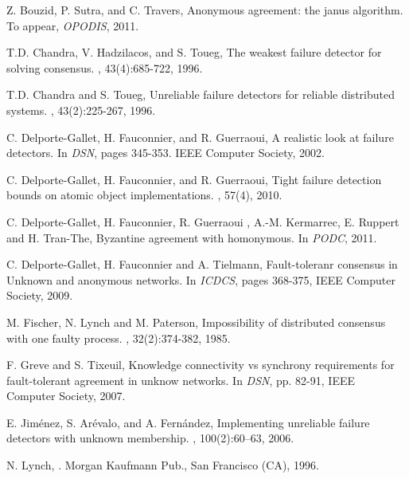 \documentclass[10pt, conference, compsocconf]{IEEEtran}
\begin{document}
\begin{thebibliography}{10}
{
Z. Bouzid, P. Sutra, and C. Travers,
\newblock Anonymous agreement: the janus algorithm.
\newblock To appear,  {\em OPODIS}, 2011.

T.D. Chandra, V. Hadzilacos, and S. Toueg,
\newblock The weakest failure detector for solving consensus.
, 43(4):685-722, 1996.

T.D. Chandra and S. Toueg,
\newblock Unreliable failure detectors for reliable distributed systems.
, 43(2):225-267, 1996.




C. Delporte-Gallet, H. Fauconnier, and R. Guerraoui,
\newblock A realistic look at failure detectors.
\newblock In {\em DSN}, pages 345-353. IEEE Computer Society, 2002.

C. Delporte-Gallet, H. Fauconnier, and R. Guerraoui,
\newblock Tight failure detection bounds on atomic object implementations.
, 57(4), 2010.


C. Delporte-Gallet, H. Fauconnier, R. Guerraoui , A.-M. Kermarrec, 
E. Ruppert   and H. Tran-The,
\newblock Byzantine agreement with homonymous.
\newblock In {\em PODC}, 2011.


C. Delporte-Gallet, H. Fauconnier and A. Tielmann,
\newblock Fault-toleranr consensus in Unknown and anonymous networks. 
\newblock In {\em ICDCS}, pages 368-375, IEEE Computer Society, 2009.



M. Fischer, N.  Lynch  and M.  Paterson,
\newblock Impossibility of distributed consensus with one faulty process.
, 32(2):374-382, 1985.


F. Greve and S. Tixeuil,
Knowledge  connectivity   vs  synchrony  requirements   for  fault-tolerant
agreement in unknow networks. 
In {\em DSN}, pp. 82-91, IEEE Computer Society, 2007.


E. Jim{\'e}nez, S. Ar{\'e}valo, and A. Fern{\'a}ndez,
\newblock Implementing unreliable failure detectors with unknown membership.
, 100(2):60--63, 2006.

N. Lynch,
.
\newblock Morgan Kaufmann Pub., San Francisco (CA), 1996.

}
\end{thebibliography}
\end{document}
